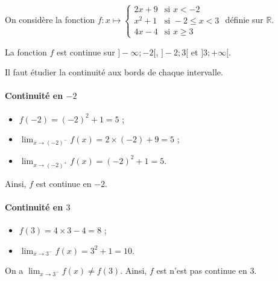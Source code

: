 \documentclass[11pt,fleqn, openany]{book} %
\begin{document}
\begin{example} On considère la fonction \renewcommand{\arraystretch}{1.2}$f:x\mapsto \left\{ \begin{array}{ll}
2x+9 & \text{si }x<-2\\
x^2+1 & \text{si }-2\leqslant x < 3\\
4x-4 & \text{si } x \geqslant 3
\end{array}\right.$ définie sur $\mathbb{R}$.

\begin{minipage}{0.7\linewidth}
La fonction $f$ est continue sur $]-\infty;-2[$, $]-2;3[$ et $]3;+\infty[$. 

Il faut étudier la continuité aux bords de chaque intervalle.

\paragraph{Continuité en $-2$}
\begin{itemize}
\item $f(-2)=(-2)^2+1=5$ ;
\item  $\displaystyle \lim_{x \to (-2)^-} f(x)=2 \times (-2)+9=5$ ;
\item  $\displaystyle \lim_{x \to (-2)^+} f(x)=(-2)^2+1=5$.
\end{itemize} 

Ainsi, $f$ est continue en $-2$.

\paragraph{Continuité en $3$}
\begin{itemize}
\item $f(3)=4 \times 3 -4 = 8$ ;
\item  $\displaystyle \lim_{x \to 3^-} f(x)=3^2+1=10$.
\end{itemize}

On a $\displaystyle \lim_{x \to 3^-} f(x) \neq f(3)$. Ainsi, $f$ est n'est pas continue en 3.\end{minipage}\hfill\begin{minipage}{0.25\linewidth}



\end{minipage}


\end{example}
\end{document}
